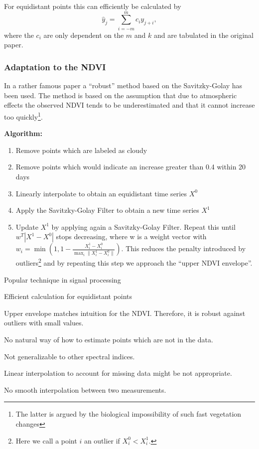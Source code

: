 For equidistant points this can efficiently be calculated by
$$
  \hat y_{j}=\sum_{i=-m}^{m} c_{i} y_{j+i},
$$
where the $c_i$ are only dependent on the $m$ and $k$ and are tabulated in the original paper.

\subsubsection*{Adaptation to the NDVI}
In a rather famous paper \cite{chenSimpleMethodReconstructing2004a} a ``robust'' method based on the Savitzky-Golay has been used.
The method is based on the assumption that due to atmospheric effects the observed NDVI tends to be underestimated and that it cannot increase too quickly\footnote{The latter is argued by the biological impossibility of such fast vegetation changes}.

\textbf{Algorithm:}
\begin{enumerate}
  \item Remove points which are labeled as cloudy
  \item Remove points which would indicate an increase greater than 0.4 within 20 days
  \item Linearly interpolate to obtain an equidistant time series $X^0$
  \item Apply the Savitzky-Golay Filter to obtain a new time series $X^1$
  \item Update $X^1$ by applying again a Savitzky-Golay Filter. Repeat this until $w^T |X^1-X^0|$ stops decreasing, where w is a weight vector with $w_i = \min\left(1, 1 - \frac{X^1_i-X^0_i}{\max_i\|X^1_i-X^0_i\|}\right)$. This reduces the penalty introduced by outliers\footnote{Here we call a point $i$ an outlier if $X^0_i<X^1_i$.} and by repeating this step we approach the ``upper NDVI envelope''.
\end{enumerate}

\begin{my_pros_cons_table}{
    \item Popular technique in signal processing
    \item Efficient calculation for equidistant points
    \item Upper envelope matches intuition for the NDVI. Therefore, it is robust against outliers with small values.
  }{
    \item No natural way of how to estimate points which are not in the data.
    \item Not generalizable to other spectral indices.
    \item Linear interpolation to account for missing data might be not appropriate.
    \item No smooth interpolation between two measurements.
  }
\end{my_pros_cons_table}


